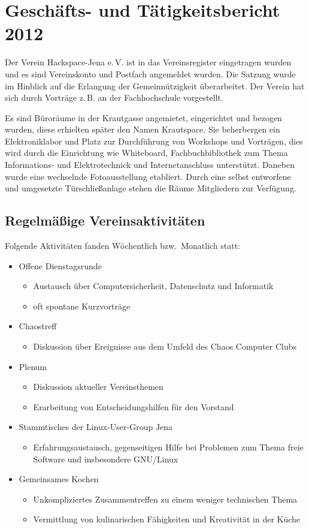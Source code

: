 \documentclass[10pt, a4paper]{scrartcl}
\begin{document}
\section*{Geschäfts- und Tätigkeitsbericht 2012}
Der Verein Hackspace-Jena e.\,V. ist in das Vereinsregister eingetragen wurden und
es sind Vereinskonto und Postfach angemeldet wurden.
Die Satzung wurde im Hinblick auf die Erlangung der Gemeinnützigkeit überarbeitet.
Der Verein hat sich durch Vorträge z.\,B. an der Fachhochschule vorgestellt.

Es sind Büroräume in der Krautgasse angemietet, eingerichtet und bezogen wurden,
diese erhielten später den Namen Krautspace.
Sie beherbergen ein Elektroniklabor und Platz zur Durchführung von Workshops und Vorträgen,
dies wird durch die Einrichtung wie Whiteboard,
Fachbuchbibliothek zum Thema Informations- und Elektrotechnick und Internetanschluss unterstützt.
Daneben wurde eine wechselnde Fotoausstellung etabliert.
Durch eine selbst entworfene und umgesetzte Türschließanlage stehen die Räume Mitgliedern zur Verfügung. 

\subsection*{Regelmäßige Vereinsaktivitäten}
Folgende Aktivitäten fanden Wöchentlich bzw.\ Monatlich statt:
\begin{itemize}
	\item Offene Dienstagsrunde
		\begin{itemize}
			\item Austausch über Computersicherheit, Datenschutz und Informatik
			\item oft spontane Kurzvorträge
		\end{itemize}
	\item Chaostreff
		\begin{itemize}
			\item Diskussion über Ereignisse aus dem Umfeld des Chaos Computer Clubs
		\end{itemize}
	\item Plenum
		\begin{itemize}
			\item Diskussion aktueller Vereinsthemen
			\item Erarbeitung von Entscheidungshilfen für den Vorstand
		\end{itemize}
	\item Stammtisches der Linux-User-Group Jena
		\begin{itemize}
			\item Erfahrungsaustausch, gegenseitigen Hilfe bei Problemen zum Thema freie Software und insbesondere GNU/Linux
		\end{itemize}
	\item Gemeinsames Kochen
		\begin{itemize}
			\item Unkompliziertes Zusammentreffen zu einem weniger technischen Thema
			\item Vermittlung von kulinarischen Fähigkeiten und Kreativität in der Küche
		\end{itemize}
\end{itemize}
\end{document}
